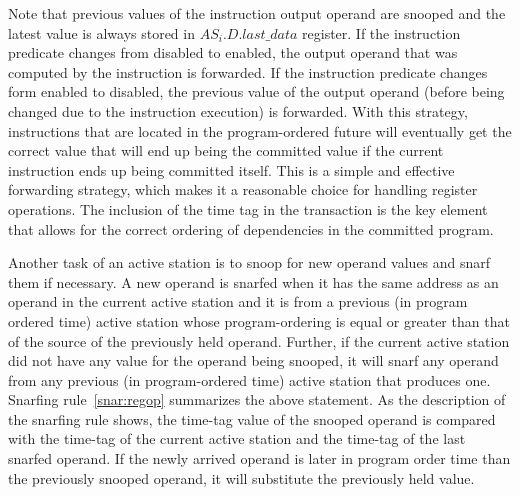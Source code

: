 \documentclass[10pt,twocolumn]{IEEEtran}
\begin{document}


Note that previous values of the instruction output operand are
snooped and the latest value is always stored in
$AS_i.D.last\_data$ register.  
If the instruction predicate
changes from disabled to enabled, the output operand that was
computed by the instruction is forwarded.  If the instruction
predicate changes form enabled to disabled, the previous value of
the output operand (before being changed due to the instruction
execution) is forwarded.  With this strategy, instructions that
are located in the program-ordered future will eventually
get the correct value that will end up being the committed value
if the current instruction ends up being committed itself.  This
is a simple and effective forwarding strategy, which makes it a
reasonable choice for handling register operations.  The inclusion
of the time tag in the transaction is the key element that allows
for the correct ordering of dependencies in the committed program.

Another task of an active station is to snoop for new operand values
and snarf them if necessary.
%
%
A new operand is snarfed when it has the
same address as an operand in the current active
station and it is from a previous (in program ordered time) active station
whose program-ordering is 
equal or greater than that of the source of the previously held operand.
Further, if the current active station did not have any value for the operand
being snooped, it will snarf any operand from any previous (in 
program-ordered time) active station that produces one.
Snarfing rule~\ref{snar:regop} summarizes the above statement.
As the description of the snarfing rule shows, the time-tag 
value of the snooped operand
is compared with the time-tag of the current active station 
and the time-tag of the last snarfed operand.  
If the newly arrived 
operand is later in program order time than the previously snooped
operand, it will substitute the previously held value.
\end{document}
